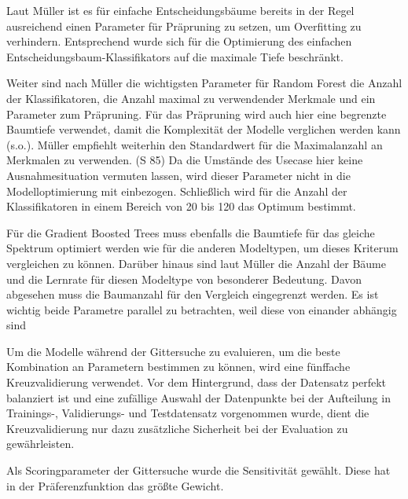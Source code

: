 Laut Müller  ist es für einfache Entscheidungsbäume bereits in der Regel ausreichend einen Parameter für Präpruning zu setzen, um Overfitting zu verhindern. Entsprechend wurde sich für die Optimierung des einfachen Entscheidungsbaum-Klassifikators auf die maximale Tiefe beschränkt. 

Weiter sind nach Müller die wichtigsten Parameter für Random Forest die Anzahl der Klassifikatoren, die Anzahl maximal zu verwendender Merkmale und ein Parameter zum Präpruning. Für das Präpruning wird auch hier eine begrenzte Baumtiefe verwendet, damit die Komplexität der Modelle verglichen werden kann (s.o.). 
Müller empfiehlt weiterhin den Standardwert für die Maximalanzahl an Merkmalen zu verwenden. (S 85) Da die Umstände des Usecase hier keine Ausnahmesituation vermuten lassen, wird dieser Parameter nicht in die Modelloptimierung mit einbezogen.
Schließlich wird für die Anzahl der Klassifikatoren in einem Bereich von 20 bis 120 das Optimum bestimmt.

Für die Gradient Boosted Trees muss ebenfalls die Baumtiefe für das gleiche Spektrum optimiert werden wie für die anderen Modeltypen, um dieses Kriterum vergleichen zu können. Darüber hinaus sind laut Müller  die Anzahl der Bäume und die Lernrate für diesen Modeltype von besonderer Bedeutung. Davon abgesehen muss die Baumanzahl für den Vergleich eingegrenzt werden. Es ist wichtig beide Parametre parallel zu betrachten, weil diese von einander abhängig sind 

Um die Modelle während der Gittersuche zu evaluieren, um die beste Kombination an Parametern bestimmen zu können, wird eine fünffache Kreuzvalidierung verwendet. Vor dem Hintergrund, dass der Datensatz perfekt balanziert ist und eine zufällige Auswahl der Datenpunkte bei der Aufteilung in Trainings-, Validierungs- und Testdatensatz vorgenommen wurde, dient die Kreuzvalidierung nur dazu zusätzliche Sicherheit bei der Evaluation zu gewährleisten.

Als Scoringparameter der Gittersuche wurde die Sensitivität gewählt. Diese hat in der Präferenzfunktion das größte Gewicht. 